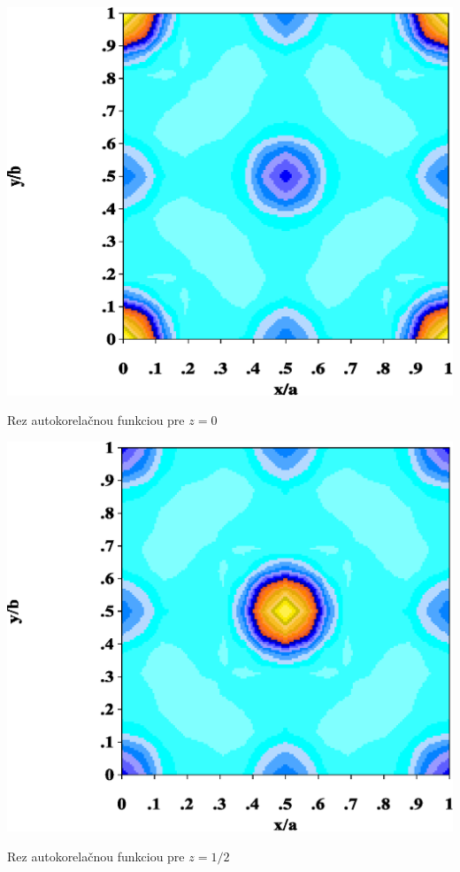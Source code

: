 \documentclass[a4paper, 10pt]{article}
\begin{document}
\begin{graph}[tb]
\centering
\hspace*{-78pt}
\includegraphics[scale=0.8]{data/k2nif4_1.eps}
\caption{ Rez autokorelačnou funkciou pre $z=0$ \label{graph:rez0}}
\end{graph}

\begin{graph}[tb]
\centering
\hspace*{-78pt}
\includegraphics[scale=0.8]{data/k2nif4_1z0_5.eps}
\caption{ Rez autokorelačnou funkciou pre $z=1/2$ \label{graph:rez1/2}}
\end{graph}
\end{document}

